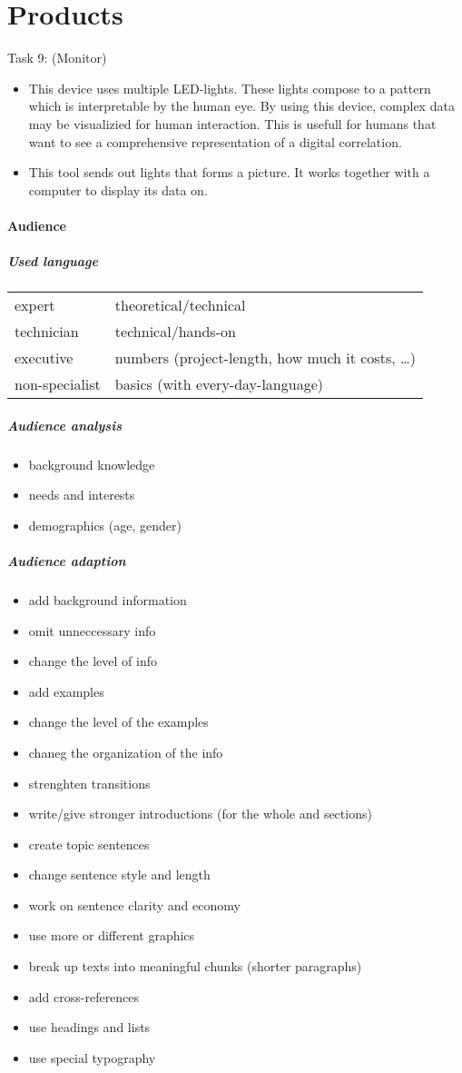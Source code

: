 \documentclass{scrreprt}
\begin{document}
\section{Products}

Task 9: (Monitor)
\begin{itemize}
\item This device uses multiple LED-lights. These lights compose to a pattern which is interpretable by the human eye. By using this device, complex data may be visualizied for human interaction. This is usefull for humans that want to see a comprehensive representation of a digital correlation.
\item This tool sends out lights that forms a picture. It works together with a computer to display its data on.
\end{itemize}

\paragraph{Audience}
\subparagraph{Used language} \parskp
\begin{tabular}{l l}
expert & theoretical/technical\\
technician & technical/hands-on\\
executive & numbers (project-length, how much it costs, …)\\
non-specialist & basics (with every-day-language)
\end{tabular}

\subparagraph{Audience analysis}
\begin{itemize}
\item background knowledge
\item needs and interests
\item demographics (age, gender)
\end{itemize}

\subparagraph{Audience adaption}
\begin{itemize}
\item add background information
\item omit unneccessary info
\item change the level of info
\item add examples
\item change the level of the examples
\item chaneg the organization of the info
\item strenghten transitions
\item write/give stronger introductions (for the whole and sections)
\item create topic sentences
\item change sentence style and length
\item work on sentence clarity and economy
\item use more or different graphics
\item break up texts into meaningful chunks (shorter paragraphs)
\item add cross-references
\item use headings and lists
\item use special typography
\end{itemize}
\end{document}
